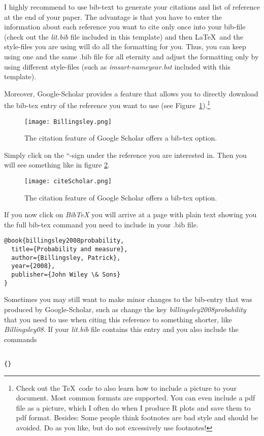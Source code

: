 \documentclass[aodsor,preprint]{imsart}
\numberwithin{equation}{section}
\theoremstyle{plain}
\begin{document}
I highly recommend to use bib-text to generate your citations and list of reference at the end of your paper. The advantage is that you have to enter the information about each reference you want to cite only once into your bib-file (check out the \emph{lit.bib} file included in this template) and then \LaTeX\ and the style-files you are using will do all the formatting for you. Thus, you can keep using one and the same .bib file for all eternity and adjust the formatting only by using different style-files (such as \emph{imsart-nameyear.bst} included with this template).

Moreover, Google-Scholar provides a feature that allows you to directly download the bib-tex entry of the reference you want to use (see Figure~\ref{fig:Billingsley}).\footnote{Check out the \TeX\ code to also learn how to include a picture to your document. Most common formats are supported. You can even include a pdf file as a picture, which I often do when I produce R plots and save them to pdf format. Besides: Some people think footnotes are bad style and should be avoided. Do as you like, but do not excessively use footnotes!}
\begin{figure}[htb]
\centering
\texttt{[image: Billingsley.png]}
\caption{The citation feature of Google Scholar offers a bib-tex option.}
\label{fig:Billingsley}
\end{figure}
Simply click on the ``-sign under the reference you are interested in. Then you will see something like in figure \ref{fig:citeScholar}.
\begin{figure}[htb]
\centering
\texttt{[image: citeScholar.png]}
\caption{The citation feature of Google Scholar offers a bib-tex option.}
\label{fig:citeScholar}
\end{figure}
If you now click on \emph{BibTeX} you will arrive at a page with plain text showing you the full bib-tex command you need to include in your .bib file.

\begin{verbatim}
@book{billingsley2008probability,
  title={Probability and measure},
  author={Billingsley, Patrick},
  year={2008},
  publisher={John Wiley \& Sons}
}
\end{verbatim}




Sometimes you may still want to make minor changes to the bib-entry that was produced by Google-Scholar, such as change the key \emph{billingsley2008probability} that you need to use when citing this reference to something shorter, like \emph{Billingsley08}.
If your \emph{lit.bib} file contains this entry and you also include the commands
\begin{verbatim}

{}
\end{verbatim}
\end{document}
